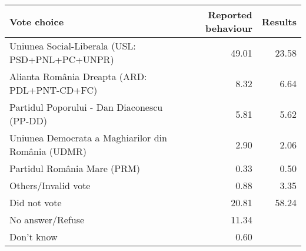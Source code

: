 
\begin{tabular}{l|rr}
\hline
Vote choice & Reported behaviour & Results\\
\hline
Uniunea Social-Liberala (USL: PSD+PNL+PC+UNPR) & 49.01 & 23.58\\
Alianta România Dreapta (ARD: PDL+PNT-CD+FC) & 8.32 & 6.64\\
Partidul Poporului - Dan Diaconescu (PP-DD) & 5.81 & 5.62\\
Uniunea Democrata a Maghiarilor din România (UDMR) & 2.90 & 2.06\\
Partidul România Mare (PRM) & 0.33 & 0.50\\
Others/Invalid vote & 0.88 & 3.35\\
Did not vote & 20.81 & 58.24\\
No answer/Refuse & 11.34 & \\
Don't know & 0.60 & \\
\hline
\end{tabular}
